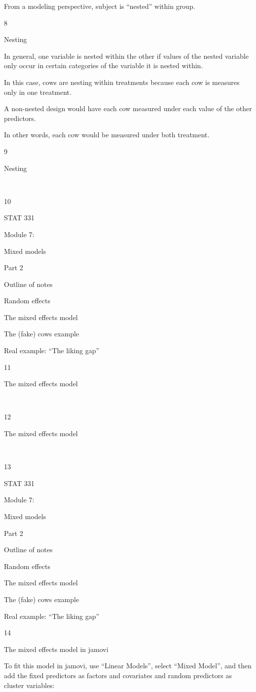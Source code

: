 \documentclass[
  letterpaper,
  DIV=11,
  numbers=noendperiod]{scrreprt}
\begin{document}
From a modeling perspective, subject is ``nested'' within group.

8

Nesting

In general, one variable is nested within the other if values of the
nested variable only occur in certain categories of the variable it is
nested within.

In this case, cows are nesting within treatments because each cow is
measures only in one treatment.

A non-nested design would have each cow measured under each value of the
other predictors.

In other words, each cow would be measured under both treatment.

9

Nesting

~

10

STAT 331

Module 7:

Mixed models

Part 2

Outline of notes

Random effects

The mixed effects model

The (fake) cows example

Real example: ``The liking gap''

11

The mixed effects model

~

12

The mixed effects model

~

13

STAT 331

Module 7:

Mixed models

Part 2

Outline of notes

Random effects

The mixed effects model

The (fake) cows example

Real example: ``The liking gap''

14

The mixed effects model in jamovi

To fit this model in jamovi, use ``Linear Models'', select ``Mixed
Model'', and then add the fixed predictors as factors and covariates and
random predictors as cluster variables:
\end{document}
